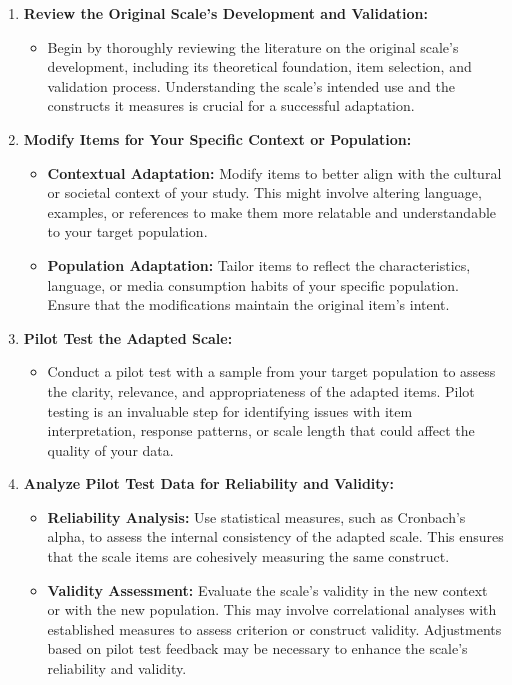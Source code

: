 \documentclass[
]{book}
\providecommand{\tightlist}{%
  \setlength{\itemsep}{0pt}\setlength{\parskip}{0pt}}
\begin{document}
\begin{enumerate}
\def\labelenumi{\arabic{enumi}.}
\tightlist
\item
  \textbf{Review the Original Scale's Development and Validation:}

  \begin{itemize}
  \tightlist
  \item
    Begin by thoroughly reviewing the literature on the original scale's development, including its theoretical foundation, item selection, and validation process. Understanding the scale's intended use and the constructs it measures is crucial for a successful adaptation.
  \end{itemize}
\item
  \textbf{Modify Items for Your Specific Context or Population:}

  \begin{itemize}
  \tightlist
  \item
    \textbf{Contextual Adaptation:} Modify items to better align with the cultural or societal context of your study. This might involve altering language, examples, or references to make them more relatable and understandable to your target population.
  \item
    \textbf{Population Adaptation:} Tailor items to reflect the characteristics, language, or media consumption habits of your specific population. Ensure that the modifications maintain the original item's intent.
  \end{itemize}
\item
  \textbf{Pilot Test the Adapted Scale:}

  \begin{itemize}
  \tightlist
  \item
    Conduct a pilot test with a sample from your target population to assess the clarity, relevance, and appropriateness of the adapted items. Pilot testing is an invaluable step for identifying issues with item interpretation, response patterns, or scale length that could affect the quality of your data.
  \end{itemize}
\item
  \textbf{Analyze Pilot Test Data for Reliability and Validity:}

  \begin{itemize}
  \tightlist
  \item
    \textbf{Reliability Analysis:} Use statistical measures, such as Cronbach's alpha, to assess the internal consistency of the adapted scale. This ensures that the scale items are cohesively measuring the same construct.
  \item
    \textbf{Validity Assessment:} Evaluate the scale's validity in the new context or with the new population. This may involve correlational analyses with established measures to assess criterion or construct validity. Adjustments based on pilot test feedback may be necessary to enhance the scale's reliability and validity.
  \end{itemize}
\end{enumerate}
\end{document}
